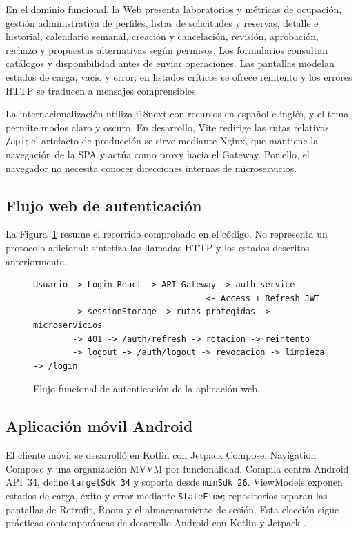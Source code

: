 En el dominio funcional, la Web presenta laboratorios y métricas de ocupación,
gestión administrativa de perfiles, listas de solicitudes y reservas, detalle e
historial, calendario semanal, creación y cancelación, revisión, aprobación,
rechazo y propuestas alternativas según permisos. Los formularios consultan
catálogos y disponibilidad antes de enviar operaciones. Las pantallas modelan
estados de carga, vacío y error; en listados críticos se ofrece reintento y los
errores HTTP se traducen a mensajes comprensibles.

La internacionalización utiliza i18next con recursos en español e inglés, y el
tema permite modos claro y oscuro. En desarrollo, Vite redirige las rutas
relativas \texttt{/api}; el artefacto de producción se sirve mediante Nginx,
que mantiene la navegación de la SPA y actúa como proxy hacia el Gateway. Por
ello, el navegador no necesita conocer direcciones internas de microservicios.

\subsection{Flujo web de autenticación}
\label{subsec:flujo-auth-web}

La Figura~\ref{fig:flujo-auth-web} resume el recorrido comprobado en el código.
No representa un protocolo adicional: sintetiza las llamadas HTTP y los estados
descritos anteriormente.

\begin{figure}[ht]
  \centering
  \begin{minipage}{0.94\linewidth}
\begin{verbatim}
Usuario -> Login React -> API Gateway -> auth-service
                                   <- Access + Refresh JWT
        -> sessionStorage -> rutas protegidas -> microservicios
        -> 401 -> /auth/refresh -> rotacion -> reintento
        -> logout -> /auth/logout -> revocacion -> limpieza -> /login
\end{verbatim}
  \end{minipage}
  \caption{Flujo funcional de autenticación de la aplicación web.}
  \label{fig:flujo-auth-web}
\end{figure}

\subsection{Aplicación móvil Android}
\label{subsec:aplicacion-mobile}

El cliente móvil se desarrolló en Kotlin con Jetpack Compose, Navigation
Compose y una organización MVVM por funcionalidad. Compila contra Android
API~34, define \texttt{targetSdk 34} y soporta desde \texttt{minSdk 26}.
ViewModels exponen estados de carga, éxito y error mediante \texttt{StateFlow};
repositorios separan las pantallas de Retrofit, Room y el almacenamiento de
sesión. Esta elección sigue prácticas contemporáneas de desarrollo Android con
Kotlin y Jetpack \cite{spath2022proandroid}.

